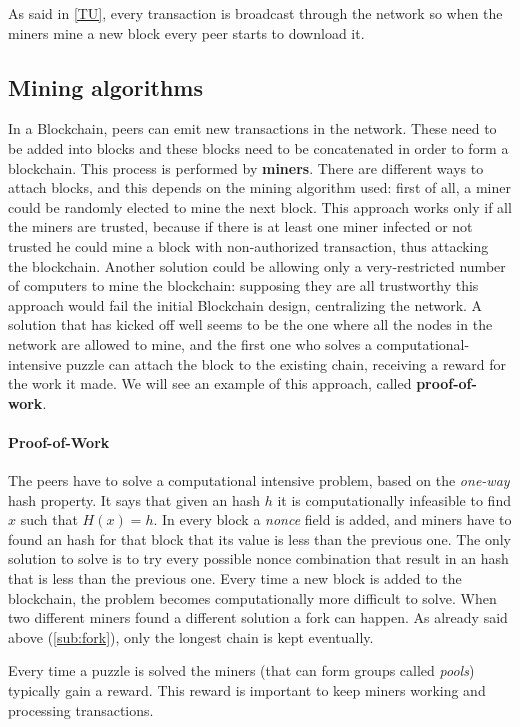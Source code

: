 As said in \ref{TU}, every transaction is broadcast through the network so when
the miners mine a new block every peer starts to download it.

\subsection{Mining algorithms}
In a Blockchain, peers can emit new transactions in the network. These
need to be added into blocks and these blocks need to be concatenated in order
to form a blockchain. This process is performed by \textbf{miners}.
There are different ways to attach blocks, and this depends on the mining
algorithm used: first of all, a miner could be randomly elected to mine the
next block. This approach works only if all the miners are trusted, because if
there is at least one miner infected or not trusted he could mine a block with
non-authorized transaction, thus attacking the blockchain. Another solution
could be allowing only a very-restricted number of computers to mine the
blockchain: supposing they are all trustworthy this approach would fail the
initial Blockchain design, centralizing the network.
A solution that has kicked off well seems to be the one where all the nodes in
the network are allowed to mine, and the first one who solves a
computational-intensive puzzle can attach the block to the existing chain,
receiving a reward for the work it made. We will see an example of this
approach, called \textbf{proof-of-work}.


\paragraph{Proof-of-Work}

The peers have to solve a computational intensive problem, based on the
\textit{one-way} hash property. It says that given an hash $h$ it is
computationally infeasible to find $x$ such that $H(x) = h$.
In every block a \textit{nonce} field is added, and miners have to found an
hash for that block that its value is less than the previous one\cite{sok15}.
The only solution to solve is to try every possible nonce combination that
result in an hash that is less than the previous one. Every time a new block is
added to the blockchain, the problem becomes computationally more difficult to
solve.
When two different miners found a different solution a fork can happen. As
already said above (\ref{sub:fork}), only the longest chain is kept eventually.

Every time a puzzle is solved the miners (that can form groups called
\textit{pools}) typically gain a reward. This reward is important to keep miners
working and processing transactions.


